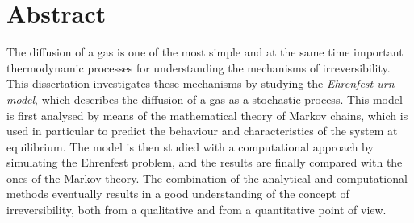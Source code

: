 \chapter*{Abstract}
The diffusion of a gas is one of the most simple and at the same time important thermodynamic processes for understanding the mechanisms of irreversibility. This dissertation investigates these mechanisms by studying the \emph{Ehrenfest urn model}, which describes the diffusion of a gas as a stochastic process. This model is first analysed by means of the mathematical theory of Markov chains, which is used in particular to predict the behaviour and characteristics of the system at equilibrium. The model is then studied with a computational approach by simulating the Ehrenfest problem, and the results are finally compared with the ones of the Markov theory. The combination of the analytical and computational methods eventually results in a good understanding of the concept of irreversibility, both from a qualitative and from a quantitative point of view.